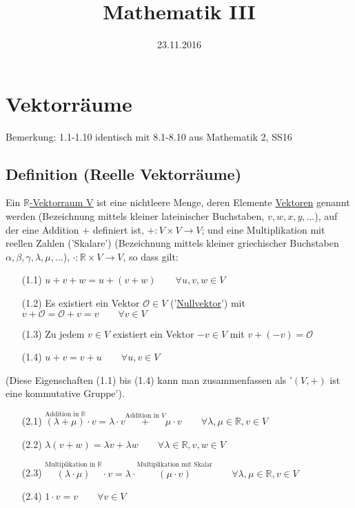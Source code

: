 \documentclass[12pt,titlepage, pdf]{article}
\title{Mathematik III}
\date{23.11.2016}
\newcommand{\R}{\mathds{R}}
\renewcommand{\>}{\rightarrow}
\renewcommand{\*}{\cdot}
\renewcommand{\O}{\mathcal{O}}
\begin{document}
	\maketitle
	\tableofcontents
	\newpage
	\section{Vektorräume}
	\small{Bemerkung: 1.1-1.10 identisch mit 8.1-8.10 aus Mathematik 2, SS16}
	\subsection{Definition (Reelle Vektorräume)}
	Ein \underline{$\R$-Vektorraum V} ist eine nichtleere Menge, deren Elemente \underline{Vektoren} genannt werden (Bezeichnung mittels kleiner lateinischer Buchstaben, $v,w,x,y,...$), auf der eine Addition $+$ definiert ist, $+\colon V\times V\>V$; und eine Multiplikation mit reellen Zahlen ('Skalare') (Bezeichnung mittels kleiner griechischer Buchstaben $\alpha, \beta, \gamma, \lambda,\mu,...$), $\*\colon\R\times V\>V$, so dass gilt:
	\begin{itemize}
		\item[(1.1)] $u+v+w=u+(v+w)\qquad\forall u,v,w\in V$
	   	\item[(1.2)] Es existiert ein Vektor $\O\in V$ ('\underline{Nullvektor}') mit $v+\O=\O+v=v\qquad\forall v\in V$
	   	\item[(1.3)] Zu jedem $v\in V$ existiert ein Vektor $-v\in V$ mit $v+(-v)=\O$
		\item[(1.4)] $u+v=v+u\qquad\forall u,v\in V$
	\end{itemize}
	(Diese Eigenschaften (1.1) bis (1.4) kann man zusammenfassen als '$(V,+)$ ist eine kommutative Gruppe').
	\begin{itemize}
		\item[(2.1)] $\overset{\textrm{Addition in }\R}{(\lambda+\mu)}\*v=\lambda\*v\overset{\textrm{Addition in }V}{+}\mu\*v\qquad\forall\lambda,\mu\in\R,v\in V$
		\item[(2.2)] $\lambda(v+w)=\lambda v+\lambda w\qquad\forall\lambda\in\R,v,w\in V$
		\item[(2.3)] $\overset{\textrm{Multiplikation in }\R}{(\lambda\*\mu)}\*v=\lambda\*\overset{\textrm{Multiplikation mit Skalar}}{(\mu\*v)}\qquad\forall\lambda,\mu\in\R,v\in V$
		\item[(2.4)] $1\*v=v\qquad\forall v\in V$
	\end{itemize}
\end{document}
